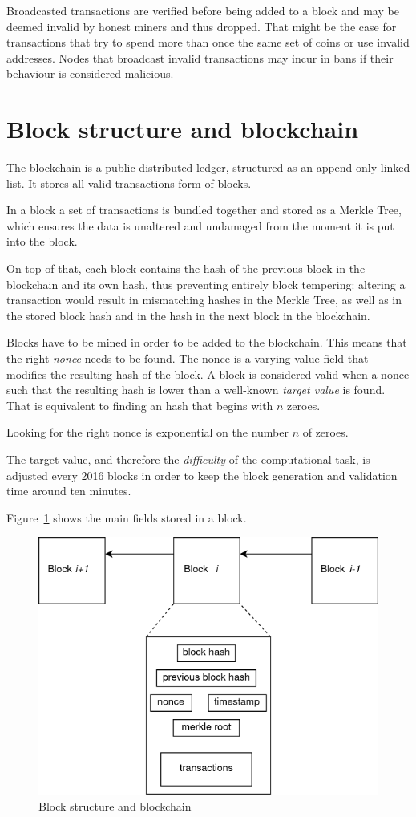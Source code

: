 Broadcasted transactions are verified before being added to a block and may be deemed invalid by honest miners and thus dropped. That might be the case for transactions that try to spend more than once the same set of coins or use invalid addresses. Nodes that broadcast invalid transactions may incur in bans if their behaviour is considered malicious.

\section{Block structure and blockchain}\label{sec:block}
The blockchain is a public distributed ledger, structured as an append-only linked list. It stores all valid transactions form of blocks.

In a block a set of transactions is bundled together and stored as a Merkle Tree, which ensures the data is unaltered and undamaged from the moment it is put into the block.

On top of that, each block contains the hash of the previous block in the blockchain and its own hash, thus preventing entirely block tempering: altering a transaction would result in mismatching hashes in the Merkle Tree, as well as in the stored block hash and in the hash in the next block in the blockchain.

Blocks have to be mined in order to be added to the blockchain. This means that the right \emph{nonce} needs to be found. The nonce is a varying value field that modifies the resulting hash of the block. A block is considered valid when a nonce such that the resulting hash is lower than a well-known \emph{target value} is found. That is equivalent to finding an hash that begins with $n$ zeroes.

Looking for the right nonce is exponential on the number $n$ of zeroes.

The target value, and therefore the \emph{difficulty} of the computational task, is adjusted every 2016 blocks in order to keep the block generation and validation time around ten minutes.

Figure~\ref{fig:blockstruct} shows the main fields stored in a block.

\begin{figure}[h]
	\includegraphics[width=.55\textwidth]{pict/blockstruct.png}
	\centering
	\caption{Block structure and blockchain}
	\label{fig:blockstruct}
\end{figure}

